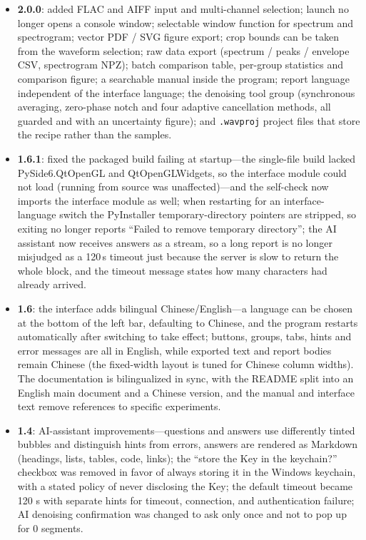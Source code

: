 \documentclass[UTF8,a4paper,12pt]{ctexart}
\begin{document}
\begin{itemize}
  \item \textbf{2.0.0}: added FLAC and AIFF input and multi-channel selection; launch no longer opens a console window; selectable window function for spectrum and spectrogram; vector PDF / SVG figure export; crop bounds can be taken from the waveform selection; raw data export (spectrum / peaks / envelope CSV, spectrogram NPZ); batch comparison table, per-group statistics and comparison figure; a searchable manual inside the program; report language independent of the interface language; the denoising tool group (synchronous averaging, zero-phase notch and four adaptive cancellation methods, all guarded and with an uncertainty figure); and \texttt{.wavproj} project files that store the recipe rather than the samples.
\item \textbf{1.6.1}: fixed the packaged build failing at startup---the single-file build lacked PySide6.QtOpenGL and QtOpenGLWidgets, so the interface module could not load (running from source was unaffected)---and the self-check now imports the interface module as well; when restarting for an interface-language switch the PyInstaller temporary-directory pointers are stripped, so exiting no longer reports ``Failed to remove temporary directory''; the AI assistant now receives answers as a stream, so a long report is no longer misjudged as a 120\,s timeout just because the server is slow to return the whole block, and the timeout message states how many characters had already arrived.
  \item \textbf{1.6}: the interface adds bilingual Chinese/English---a language can be chosen at the bottom of the left bar, defaulting to Chinese, and the program restarts automatically after switching to take effect; buttons, groups, tabs, hints and error messages are all in English, while exported text and report bodies remain Chinese (the fixed-width layout is tuned for Chinese column widths). The documentation is bilingualized in sync, with the README split into an English main document and a Chinese version, and the manual and interface text remove references to specific experiments.
  \item \textbf{1.4}: AI-assistant improvements---questions and answers use differently tinted bubbles and distinguish hints from errors, answers are rendered as Markdown (headings, lists, tables, code, links); the ``store the Key in the keychain?'' checkbox was removed in favor of always storing it in the Windows keychain, with a stated policy of never disclosing the Key; the default timeout became 120 s with separate hints for timeout, connection, and authentication failure; AI denoising confirmation was changed to ask only once and not to pop up for 0 segments.

\end{itemize}
\end{document}
